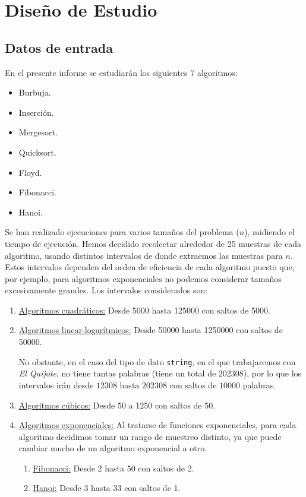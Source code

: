 \documentclass[12pt]{article}
\begin{document}
    
    \section{Diseño de Estudio}
    \subsection{Datos de entrada}
    En el presente informe se estudiarán los siguientes $7$ algoritmos:
    \begin{itemize}
        \item Burbuja.
        \item Inserción.
        \item Mergesort.
        \item Quicksort.
        \item Floyd.
        \item Fibonacci.
        \item Hanoi.
    \end{itemize}
    Se han realizado ejecuciones para varios tamaños del problema ($n$), midiendo el tiempo de ejecución. Hemos decidido recolectar alrededor de 25 muestras de cada algoritmo, usando distintos intervalos de donde extraemos las muestras para $n$. Estos intervalos dependen del orden de eficiencia de cada algoritmo puesto que, por ejemplo, para algoritmos exponenciales no podemos considerar tamaños excesivamente grandes.
    Los intervalos considerados son:
    \begin{enumerate}
        \item \ul{Algoritmos cuadráticos:} Desde 5000 hasta 125000 con saltos de 5000.
        \item \ul{Algoritmos linear-logarítmicos:} Desde 50000 hasta 1250000 con saltos de 50000.

        No obstante, en el caso del tipo de dato \verb|string|, en el que trabajaremos con \emph{El Quijote}, no tiene tantas palabras (tiene un total de $202308$), por
        lo que los intervalos irán desde $12308$ hasta $202308$ con saltos de $10000$ palabras.
        \item \ul{Algoritmos cúbicos:} Desde 50 a 1250 con saltos de 50.
        \item \ul{Algoritmos exponenciales:}
        Al tratarse de funciones exponenciales, para cada algoritmo decidimos tomar un rango de muestreo distinto, ya que puede cambiar mucho de un algoritmo exponencial a otro.
        \begin{enumerate}
            \item \ul{Fibonacci:} Desde 2 hasta 50 con saltos de 2.
            \item \ul{Hanoi:} Desde 3 hasta 33 con saltos de 1.
        \end{enumerate}
    \end{enumerate}
\end{document}
